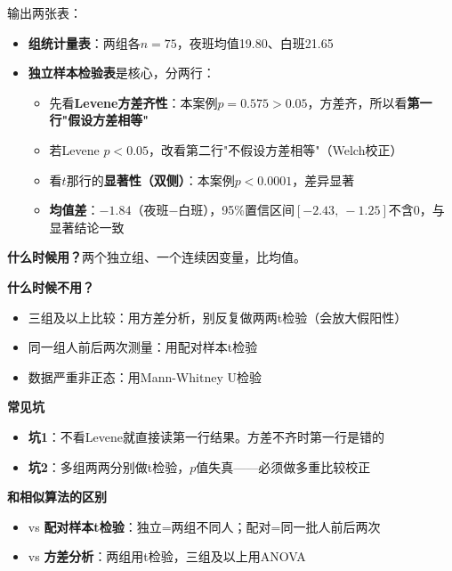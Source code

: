 \begin{algoresult}
输出两张表：
\begin{itemize}
    \item \textbf{组统计量表}：两组各$n=75$，夜班均值19.80、白班21.65
    \item \textbf{独立样本检验表}是核心，分两行：
    \begin{itemize}
        \item 先看\textbf{Levene方差齐性}：本案例$p=0.575>0.05$，方差齐，所以看\textbf{第一行"假设方差相等"}
        \item 若Levene $p<0.05$，改看第二行"不假设方差相等"（Welch校正）
        \item 看$t$那行的\textbf{显著性（双侧）}：本案例$p<0.0001$，差异显著
        \item \textbf{均值差}：$-1.84$（夜班$-$白班），95\%置信区间$[-2.43,\ -1.25]$不含0，与显著结论一致
    \end{itemize}
\end{itemize}
\end{algoresult}

\begin{algonotes}
\textbf{什么时候用？}两个独立组、一个连续因变量，比均值。

\textbf{什么时候不用？}
\begin{itemize}
    \item 三组及以上比较：用方差分析，别反复做两两t检验（会放大假阳性）
    \item 同一组人前后两次测量：用配对样本t检验
    \item 数据严重非正态：用Mann-Whitney U检验
\end{itemize}

\textbf{常见坑}
\begin{itemize}
    \item \textbf{坑1}：不看Levene就直接读第一行结果。方差不齐时第一行是错的
    \item \textbf{坑2}：多组两两分别做t检验，$p$值失真——必须做多重比较校正
\end{itemize}

\textbf{和相似算法的区别}
\begin{itemize}
    \item vs \textbf{配对样本t检验}：独立=两组不同人；配对=同一批人前后两次
    \item vs \textbf{方差分析}：两组用t检验，三组及以上用ANOVA
\end{itemize}
\end{algonotes}


